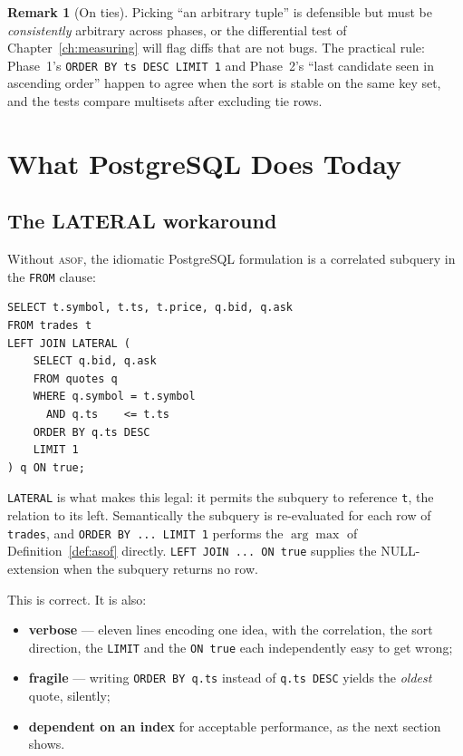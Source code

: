 \documentclass[11pt,a4paper]{report}
\theoremstyle{definition}
\newtheorem{remark}[definition]{Remark}
\theoremstyle{plain}
\newcommand{\code}[1]{\texttt{\small #1}}
\newcommand{\asof}{{\normalfont\scshape asof}}
\begin{document}
\begin{remark}[On ties]
Picking ``an arbitrary tuple'' is defensible but must be \emph{consistently} arbitrary
across phases, or the differential test of Chapter~\ref{ch:measuring} will flag diffs that
are not bugs. The practical rule: Phase~1's \code{ORDER BY ts DESC LIMIT 1} and Phase~2's
``last candidate seen in ascending order'' happen to agree when the sort is stable on the
same key set, and the tests compare multisets after excluding tie rows.
\end{remark}

\chapter{What PostgreSQL Does Today}

\section{The LATERAL workaround}

Without \asof{}, the idiomatic PostgreSQL formulation is a correlated subquery in the
\code{FROM} clause:

\begin{lstlisting}
SELECT t.symbol, t.ts, t.price, q.bid, q.ask
FROM trades t
LEFT JOIN LATERAL (
    SELECT q.bid, q.ask
    FROM quotes q
    WHERE q.symbol = t.symbol
      AND q.ts    <= t.ts
    ORDER BY q.ts DESC
    LIMIT 1
) q ON true;
\end{lstlisting}

\code{LATERAL} is what makes this legal: it permits the subquery to reference \code{t},
the relation to its left. Semantically the subquery is re-evaluated for each row of
\code{trades}, and \code{ORDER BY ... LIMIT 1} performs the $\arg\max$ of
Definition~\ref{def:asof} directly. \code{LEFT JOIN ... ON true} supplies the
NULL-extension when the subquery returns no row.

This is correct. It is also:

\begin{itemize}[nosep]
\item \textbf{verbose} --- eleven lines encoding one idea, with the correlation, the sort
      direction, the \code{LIMIT} and the \code{ON true} each independently easy to get
      wrong;
\item \textbf{fragile} --- writing \code{ORDER BY q.ts} instead of \code{q.ts DESC} yields
      the \emph{oldest} quote, silently;
\item \textbf{dependent on an index} for acceptable performance, as the next section shows.
\end{itemize}
\end{document}

